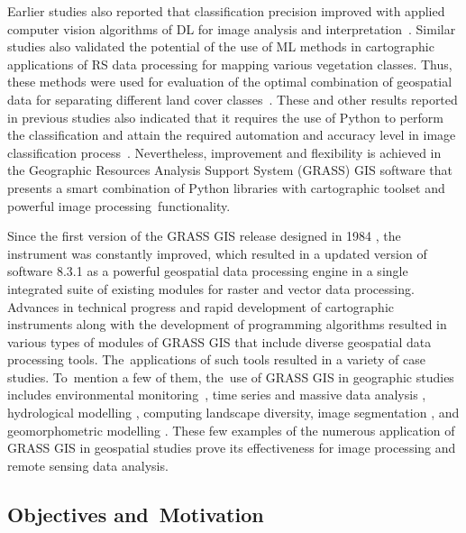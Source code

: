 \documentclass[coasts,article,accept,pdftex,oneauthor]{Definitions/mdpi}
\begin{document}
Earlier studies also reported that classification precision improved with applied computer vision algorithms of DL for image analysis and interpretation~\cite{GUO20231,rs15215121,DOU2021102477}. Similar studies also validated the potential of the use of ML methods in cartographic{ }applications {of RS data processing }for mapping various vegetation classes{. Thus, these methods were used for evaluation of }the optimal combination of geospatial data for separating different land cover classes~\cite{BOULILA2021106014,LIN2024102618}. These and other{ }results {reported in previous studies }also indicated that it requires the use of Python to perform the classification and attain the required automation and accuracy level in image classification process~\cite{ROBERTS2022105192,GUO2023e21542,Redoloza}. Nevertheless, improvement and flexibility is achieved in the Geographic Resources Analysis Support System (GRASS) GIS software that presents a smart combination of Python libraries with cartographic toolset and powerful image processing~functionality. 

{Since the first version of the GRASS GIS release designed in 1984} \cite{GRASS_GIS_software}, {the instrument was constantly improved, which resulted in a updated version of software 8.3.1 as a powerful geospatial data processing engine in a single integrated suite of existing modules for raster and vector data processing. Advances in technical progress and rapid development of cartographic instruments along with the development of programming algorithms resulted in various types of modules of GRASS GIS that include diverse geospatial data processing tools. The~applications of such tools resulted in a variety of case studies. To~mention a few of them, the~use of GRASS GIS in geographic studies includes environmental monitoring}~\cite{STRIGARO201668,Lemenkova202322}, {time series and massive data analysis} \cite{JASIEWICZ20111525,Lemenkova202313}, {hydrological modelling} \cite{JASIEWICZ20111162}, {computing landscape diversity, image segmentation} \cite{Lemenkova202320,ROCCHINI201382}, {and geomorphometric modelling} \cite{HOFIERKA2009387}. {These few examples of the numerous application of GRASS GIS in geospatial studies prove its effectiveness for image processing and remote sensing data analysis.}

\subsection{Objectives and~Motivation}
\end{document}
